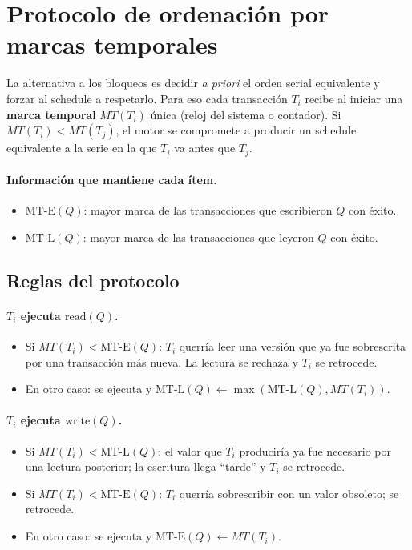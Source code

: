 \documentclass[11pt,a4paper]{article}
\begin{document}
\section{Protocolo de ordenación por marcas temporales}

La alternativa a los bloqueos es decidir \emph{a priori} el orden serial
equivalente y forzar al schedule a respetarlo. Para eso cada transacción
$T_i$ recibe al iniciar una \textbf{marca temporal} $MT(T_i)$ única
(reloj del sistema o contador). Si $MT(T_i) < MT(T_j)$, el motor se
compromete a producir un schedule equivalente a la serie en la que $T_i$
va antes que $T_j$.

\paragraph{Información que mantiene cada ítem.}
\begin{itemize}
    \item $\mathrm{MT\text{-}E}(Q)$: mayor marca de las transacciones que
    escribieron $Q$ con éxito.
    \item $\mathrm{MT\text{-}L}(Q)$: mayor marca de las transacciones que
    leyeron $Q$ con éxito.
\end{itemize}

\subsection{Reglas del protocolo}

\paragraph{$T_i$ ejecuta $\mathrm{read}(Q)$.}
\begin{itemize}
    \item Si $MT(T_i) < \mathrm{MT\text{-}E}(Q)$: $T_i$ querría leer una
    versión que ya fue sobrescrita por una transacción más nueva. La
    lectura se rechaza y $T_i$ se retrocede.
    \item En otro caso: se ejecuta y
    $\mathrm{MT\text{-}L}(Q) \gets \max(\mathrm{MT\text{-}L}(Q), MT(T_i))$.
\end{itemize}

\paragraph{$T_i$ ejecuta $\mathrm{write}(Q)$.}
\begin{itemize}
    \item Si $MT(T_i) < \mathrm{MT\text{-}L}(Q)$: el valor que $T_i$
    produciría ya fue necesario por una lectura posterior; la escritura
    llega ``tarde'' y $T_i$ se retrocede.
    \item Si $MT(T_i) < \mathrm{MT\text{-}E}(Q)$: $T_i$ querría
    sobrescribir con un valor obsoleto; se retrocede.
    \item En otro caso: se ejecuta y
    $\mathrm{MT\text{-}E}(Q) \gets MT(T_i)$.
\end{itemize}
\end{document}
